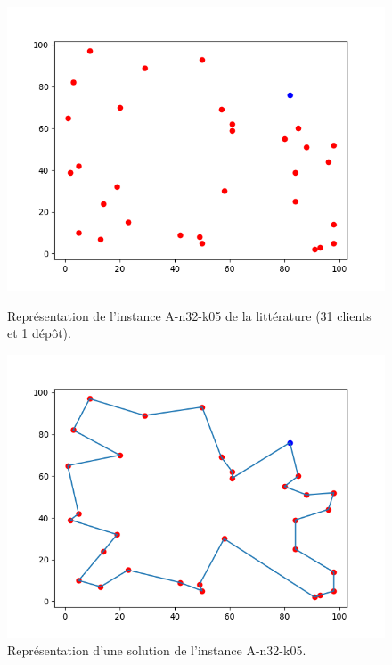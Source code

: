 \documentclass[a4paper,11pt]{article}%
\begin{document}
\begin{figure}
    \begin{minipage}[c]{.46\linewidth}
        \centering
		\includegraphics[scale=0.5]{Instance.png}
		\caption{Représentation de l'instance A-n32-k05 de la littérature (31 clients et 1 dépôt).}
		\label{Instance3205}
    \end{minipage}
    \hfill%
    \begin{minipage}[c]{.46\linewidth}
        \centering
        \includegraphics[scale=0.5]{solutionNoCapacity.png}
		\caption{Représentation d'une solution de l'instance A-n32-k05.}
		\label{SNC3205}
    \end{minipage}
\end{figure}
\end{document}
